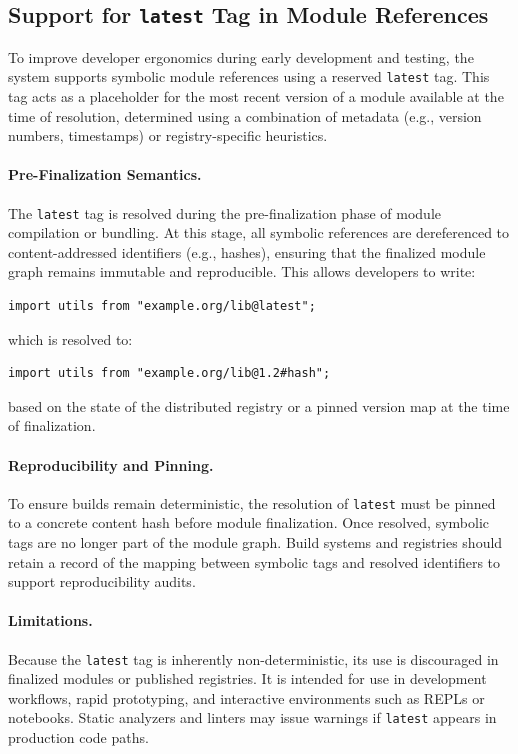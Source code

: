 \documentclass[sigplan,screen]{acmart}
\begin{document}
\subsection{Support for \texttt{latest} Tag in Module References}

To improve developer ergonomics during early development and testing, the system supports symbolic module references using a reserved \texttt{latest} tag. This tag acts as a placeholder for the most recent version of a module available at the time of resolution, determined using a combination of metadata (e.g., version numbers, timestamps) or registry-specific heuristics.

\paragraph{Pre-Finalization Semantics.}
The \texttt{latest} tag is resolved during the pre-finalization phase of module compilation or bundling. At this stage, all symbolic references are dereferenced to content-addressed identifiers (e.g., hashes), ensuring that the finalized module graph remains immutable and reproducible. This allows developers to write:

\begin{verbatim}
import utils from "example.org/lib@latest";
\end{verbatim}

\noindent which is resolved to:

\begin{verbatim}
import utils from "example.org/lib@1.2#hash";
\end{verbatim}

\noindent based on the state of the distributed registry or a pinned version map at the time of finalization.

\paragraph{Reproducibility and Pinning.}
To ensure builds remain deterministic, the resolution of \texttt{latest} must be pinned to a concrete content hash before module finalization. Once resolved, symbolic tags are no longer part of the module graph. Build systems and registries should retain a record of the mapping between symbolic tags and resolved identifiers to support reproducibility audits.

\paragraph{Limitations.}
Because the \texttt{latest} tag is inherently non-deterministic, its use is discouraged in finalized modules or published registries. It is intended for use in development workflows, rapid prototyping, and interactive environments such as REPLs or notebooks. Static analyzers and linters may issue warnings if \texttt{latest} appears in production code paths.
\end{document}
